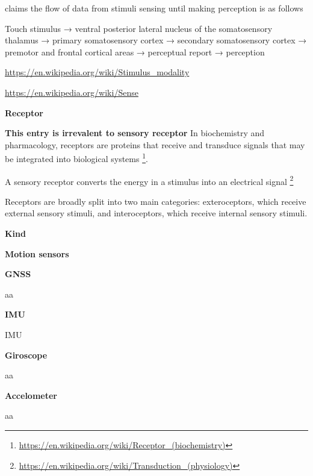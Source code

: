 \documentclass{book}
\providecommand{\ProjectDeepHeading}[2]{%
    \par\medskip\noindent\textbf{#2}\par\smallskip
}
\providecommand{\seeherefooter}[1]{\footnote{\url{#1}}}
\begin{document}
    \cite{romo-2020-turning-touch-into-perception} claims the flow of data from stimuli sensing until making perception is as follows
    
    Touch stimulus → ventral posterior lateral nucleus of the somatosensory thalamus → primary somatosensory cortex → secondary somatosensory cortex → premotor and frontal cortical areas → perceptual report → perception


\url{https://en.wikipedia.org/wiki/Stimulus_modality}


\url{https://en.wikipedia.org/wiki/Sense}

\ProjectDeepHeading{4}{Receptor}


\textbf{This entry is irrevalent to sensory receptor}  In biochemistry and pharmacology, receptors are proteins that receive and transduce signals that may be integrated into biological systems \seeherefooter{https://en.wikipedia.org/wiki/Receptor_(biochemistry)}.
    
    A sensory receptor converts the energy in a stimulus into an electrical signal \seeherefooter{https://en.wikipedia.org/wiki/Transduction_(physiology)}
    
    Receptors are broadly split into two main categories: exteroceptors, which receive external sensory stimuli, and interoceptors, which receive internal sensory stimuli.

\ProjectDeepHeading{5}{Kind}


\ProjectDeepHeading{9}{Motion sensors}
    
    \ProjectDeepHeading{9}{GNSS}
        aa
    
    \ProjectDeepHeading{9}{IMU}
        IMU
        
        \ProjectDeepHeading{10}{Giroscope}
            aa
        
        \ProjectDeepHeading{10}{Accelometer}
            aa
        
\end{document}
